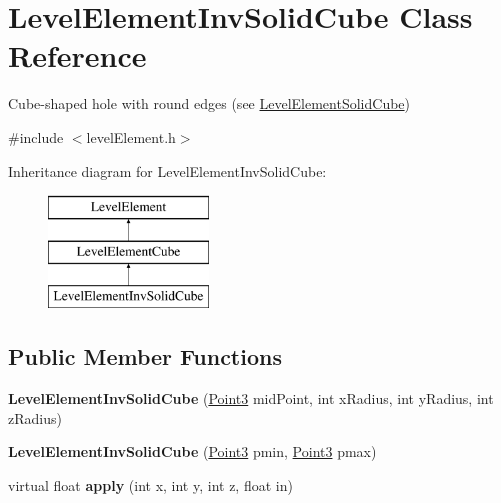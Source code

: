 \hypertarget{classLevelElementInvSolidCube}{
\section{\-Level\-Element\-Inv\-Solid\-Cube \-Class \-Reference}
\label{d3/dfa/classLevelElementInvSolidCube}
}


\-Cube-\/shaped hole with round edges (see \hyperlink{classLevelElementSolidCube}{\-Level\-Element\-Solid\-Cube})  




{\ttfamily \#include $<$level\-Element.\-h$>$}

\-Inheritance diagram for \-Level\-Element\-Inv\-Solid\-Cube\-:\begin{figure}[H]
\begin{center}
\leavevmode
\includegraphics[height=3.000000cm]{d3/dfa/classLevelElementInvSolidCube}
\end{center}
\end{figure}
\subsection*{\-Public \-Member \-Functions}
\begin{DoxyCompactItemize}
\item 
\hypertarget{classLevelElementInvSolidCube_a9e32eb6a44f90595c064777bd8677f6f}{
{\bfseries \-Level\-Element\-Inv\-Solid\-Cube} (\hyperlink{classPoint3}{\-Point3} mid\-Point, int x\-Radius, int y\-Radius, int z\-Radius)}
\label{d3/dfa/classLevelElementInvSolidCube_a9e32eb6a44f90595c064777bd8677f6f}

\item 
\hypertarget{classLevelElementInvSolidCube_a4dac7add801ded864d59747cf1210b68}{
{\bfseries \-Level\-Element\-Inv\-Solid\-Cube} (\hyperlink{classPoint3}{\-Point3} pmin, \hyperlink{classPoint3}{\-Point3} pmax)}
\label{d3/dfa/classLevelElementInvSolidCube_a4dac7add801ded864d59747cf1210b68}

\item 
\hypertarget{classLevelElementInvSolidCube_a9746c12f363892726278a0ffc779f8b9}{
virtual float {\bfseries apply} (int x, int y, int z, float in)}
\label{d3/dfa/classLevelElementInvSolidCube_a9746c12f363892726278a0ffc779f8b9}

\end{DoxyCompactItemize}



